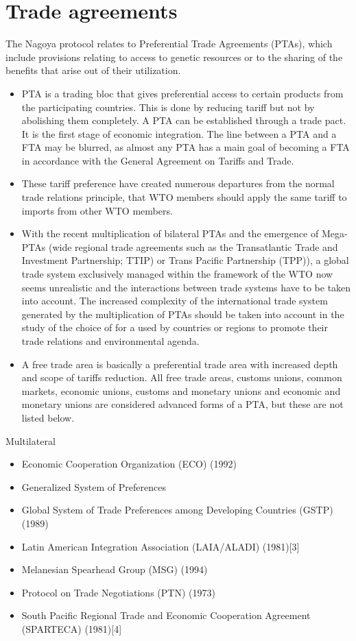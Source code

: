 \documentclass[
  openany]{book}
\providecommand{\tightlist}{%
  \setlength{\itemsep}{0pt}\setlength{\parskip}{0pt}}
\begin{document}
\hypertarget{trade-agreements}{%
\section{Trade agreements}\label{trade-agreements}}

The Nagoya protocol relates to Preferential Trade Agreements (PTAs), which include provisions relating to access to genetic resources or to the sharing of the benefits that arise out of their utilization.

\begin{itemize}
\item
  PTA is a trading bloc that gives preferential access to certain products from the participating countries. This is done by reducing tariff but not by abolishing them completely. A PTA can be established through a trade pact. It is the first stage of economic integration. The line between a PTA and a FTA may be blurred, as almost any PTA has a main goal of becoming a FTA in accordance with the General Agreement on Tariffs and Trade.
\item
  These tariff preference have created numerous departures from the normal trade relations principle, that WTO members should apply the same tariff to imports from other WTO members.
\item
  With the recent multiplication of bilateral PTAs and the emergence of Mega-PTAs (wide regional trade agreements such as the Transatlantic Trade and Investment Partnership; TTIP) or Trans Pacific Partnership (TPP)), a global trade system exclusively managed within the framework of the WTO now seems unrealistic and the interactions between trade systems have to be taken into account. The increased complexity of the international trade system generated by the multiplication of PTAs should be taken into account in the study of the choice of for a used by countries or regions to promote their trade relations and environmental agenda.
\item
  A free trade area is basically a preferential trade area with increased depth and scope of tariffs reduction. All free trade areas, customs unions, common markets, economic unions, customs and monetary unions and economic and monetary unions are considered advanced forms of a PTA, but these are not listed below.
\end{itemize}

Multilateral

\begin{itemize}
\tightlist
\item
  Economic Cooperation Organization (ECO) (1992)
\item
  Generalized System of Preferences
\item
  Global System of Trade Preferences among Developing Countries (GSTP) (1989)
\item
  Latin American Integration Association (LAIA/ALADI) (1981){[}3{]}
\item
  Melanesian Spearhead Group (MSG) (1994)
\item
  Protocol on Trade Negotiations (PTN) (1973)
\item
  South Pacific Regional Trade and Economic Cooperation Agreement (SPARTECA) (1981){[}4{]}
\end{itemize}
\end{document}
